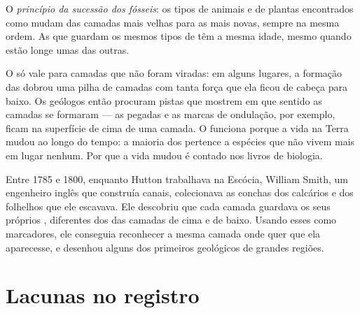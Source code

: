 \begin{definition}\label{def:g7:geological-time:fossil-succession}
O \emph{princípio da sucessão dos fósseis}: os tipos de animais e de plantas encontrados como  mudam
das camadas mais velhas para as mais novas, sempre na mesma ordem. As
 que guardam os mesmos tipos de  têm a mesma idade, mesmo
quando estão longe umas das outras.
\end{definition}


O  só vale para camadas que não foram viradas:
em alguns lugares, a formação das  dobrou uma pilha de camadas
com tanta força que ela ficou de cabeça para baixo. Os geólogos então
procuram pistas que mostrem em que sentido as camadas se formaram --- as
pegadas e as marcas de ondulação, por exemplo, ficam na superfície de cima
de uma camada. O  funciona porque a vida
na Terra mudou ao longo do tempo: a maioria dos  pertence a
espécies que não vivem mais em lugar nenhum. Por que a vida mudou é
contado nos livros de biologia.

\begin{history}
Entre 1785 e 1800, enquanto Hutton trabalhava na Escócia, William Smith,
um engenheiro inglês que construía canais, colecionava as conchas 
dos calcários e dos folhelhos que ele escavava. Ele descobriu que cada
camada guardava os seus próprios , diferentes dos das camadas de
cima e de baixo. Usando esses  como marcadores, ele conseguia
reconhecer a mesma camada onde quer que ela aparecesse, e desenhou alguns
dos primeiros  geológicos de grandes regiões.
\end{history}

\section{Lacunas no registro}

